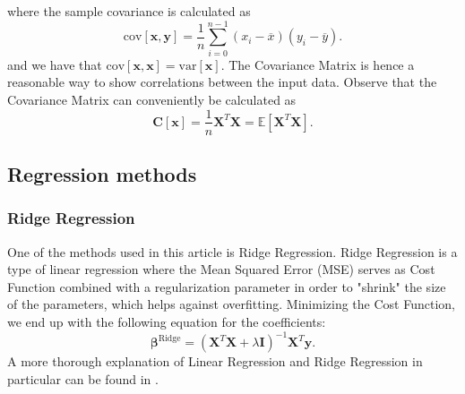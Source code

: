 \documentclass[11pt,a4paper,notitlepage]{article}
\begin{document}
where the sample covariance is calculated as 
\begin{equation}
\mathrm{cov}[\boldsymbol{x},\boldsymbol{y}] =\frac{1}{n} \sum_{i=0}^{n-1}(x_i- \overline{x})(y_i- \overline{y}).
\end{equation}
and we have that $\mathrm{cov}[\boldsymbol{x},\boldsymbol{x}] =\mathrm{var}[\boldsymbol{x}]$. The Covariance Matrix is hence a reasonable way to show correlations between the input data. Observe that the Covariance Matrix can conveniently be calculated as
\begin{equation}
\boldsymbol{C}[\boldsymbol{x}] = \frac{1}{n}\boldsymbol{X}^T\boldsymbol{X}= \mathbb{E}[\boldsymbol{X}^T\boldsymbol{X}].
\end{equation}
\subsection{Regression methods}
\subsubsection{Ridge Regression}
One of the methods used in this article is Ridge Regression. Ridge Regression is a type of linear regression where the Mean Squared Error (MSE) serves as Cost Function combined with a regularization parameter in order to "shrink" the size of the parameters, which helps against overfitting. Minimizing the Cost Function, we end up with the following equation for the coefficients:
\begin{equation*}
    \boldsymbol{\beta}^{\mathrm{Ridge}} = \left(\boldsymbol{X}^T\boldsymbol{X}+\lambda\boldsymbol{I}\right)^{-1}\boldsymbol{X}^T\boldsymbol{y}.
\end{equation*}
A more thorough explanation of Linear Regression and Ridge Regression in particular can be found in \citep{Project1}.
\end{document}

